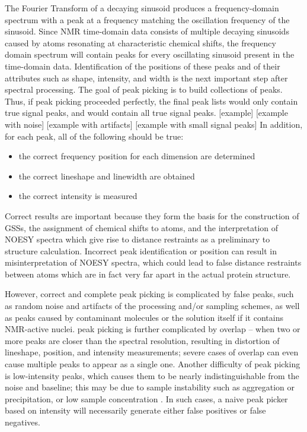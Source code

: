 The Fourier Transform of a decaying sinusoid produces a frequency-domain 
spectrum with a peak at a frequency matching the oscillation frequency of 
the sinusoid.  Since NMR time-domain data consists of multiple decaying 
sinusoids caused by atoms resonating at characteristic chemical shifts, 
the frequency domain spectrum will contain peaks for every oscillating 
sinusoid present in the time-domain data.  Identification of the positions 
of these peaks and of their attributes such as shape, intensity, and width 
is the next important step after spectral processing.  The goal of peak 
picking is to build collections of peaks.  Thus, if peak picking proceeded 
perfectly, the final peak lists would only contain true signal peaks, and 
would contain all true signal peaks.  
[example] [example with noise] [example with artifacts] [example with small signal peaks]  
In addition, for each peak, all of the following should be true: 
\begin{itemize}
  \item the correct frequency position for each dimension are determined
  \item the correct lineshape and linewidth are obtained
  \item the correct intensity is measured
\end{itemize}

Correct results are important because they form the basis for the construction 
of GSSs, the assignment of chemical shifts to atoms, and the interpretation of 
NOESY spectra which give rise to distance restraints as a preliminary to 
structure calculation.  Incorrect peak identification or position can result 
in misinterpretation of NOESY spectra, which could lead to false distance 
restraints between atoms which are in fact very far apart in the actual 
protein structure.
	
However, correct and complete peak picking is complicated by false peaks, 
such as random noise and artifacts of the processing and/or sampling schemes, 
as well as peaks caused by contaminant molecules or the solution itself if it 
contains NMR-active nuclei.  peak picking is further complicated by overlap -- 
when two or more peaks are closer than the spectral resolution, resulting in 
distortion of lineshape, position, and intensity measurements; severe cases 
of overlap can even cause multiple peaks to appear as a single one.  Another 
difficulty of peak picking is low-intensity peaks, which causes them to be 
nearly indistinguishable from the noise and baseline; this may be due to 
sample instability such as aggregation or precipitation, or low sample 
concentration
\cite{picky, munin, korzhnev2001munin, apart,
autopsy, pine}
\cite{williamson2009automated, guntert2009automated, altieri2004automation,
baran2004automated}.
In such cases, a naive peak picker based on intensity will necessarily 
generate either false positives or false negatives.

